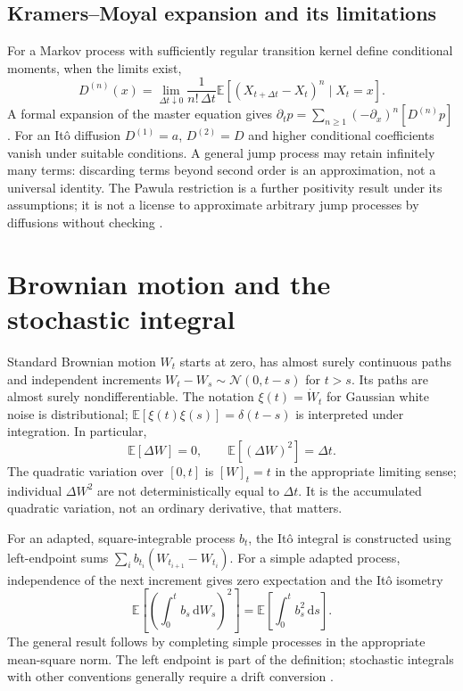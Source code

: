 \documentclass[11pt,a4paper]{article}
\newcommand{\dd}{\mathrm d}
\newcommand{\E}{\mathbb E}
\theoremstyle{remark}\newtheorem*{remark}{Physical interpretation}
\begin{document}
\subsection{Kramers--Moyal expansion and its limitations}
For a Markov process with sufficiently regular transition kernel define conditional moments, when the limits exist,
\begin{equation}D^{(n)}(x)=\lim_{\Delta t\downarrow0}\frac{1}{n!\,\Delta t}\E[(X_{t+\Delta t}-X_t)^n\mid X_t=x].\end{equation}
A formal expansion of the master equation gives $\partial_t p=\sum_{n\geq1}(-\partial_x)^n[D^{(n)}p]$. For an It\^o diffusion $D^{(1)}=a$, $D^{(2)}=D$ and higher conditional coefficients vanish under suitable conditions. A general jump process may retain infinitely many terms: discarding terms beyond second order is an approximation, not a universal identity. The Pawula restriction is a further positivity result under its assumptions; it is not a license to approximate arbitrary jump processes by diffusions without checking \cite{vankampen,risken}.

\section{Brownian motion and the stochastic integral}
Standard Brownian motion $W_t$ starts at zero, has almost surely continuous paths and independent increments $W_t-W_s\sim\mathcal N(0,t-s)$ for $t>s$. Its paths are almost surely nondifferentiable. The notation $\xi(t)=\dot W_t$ for Gaussian white noise is distributional; $\E[\xi(t)\xi(s)]=\delta(t-s)$ is interpreted under integration. In particular,
\begin{equation}\E[\Delta W]=0,\qquad \E[(\Delta W)^2]=\Delta t.\end{equation}
The quadratic variation over $[0,t]$ is $[W]_t=t$ in the appropriate limiting sense; individual $\Delta W^2$ are not deterministically equal to $\Delta t$. It is the accumulated quadratic variation, not an ordinary derivative, that matters.

For an adapted, square-integrable process $b_t$, the It\^o integral is constructed using left-endpoint sums $\sum_i b_{t_i}(W_{t_{i+1}}-W_{t_i})$. For a simple adapted process, independence of the next increment gives zero expectation and the It\^o isometry
\begin{equation}\E\left[\left(\int_0^t b_s\,\dd W_s\right)^2\right]=\E\left[\int_0^t b_s^2\,\dd s\right].\end{equation}
The general result follows by completing simple processes in the appropriate mean-square norm. The left endpoint is part of the definition; stochastic integrals with other conventions generally require a drift conversion \cite{gardiner}.
\end{document}
